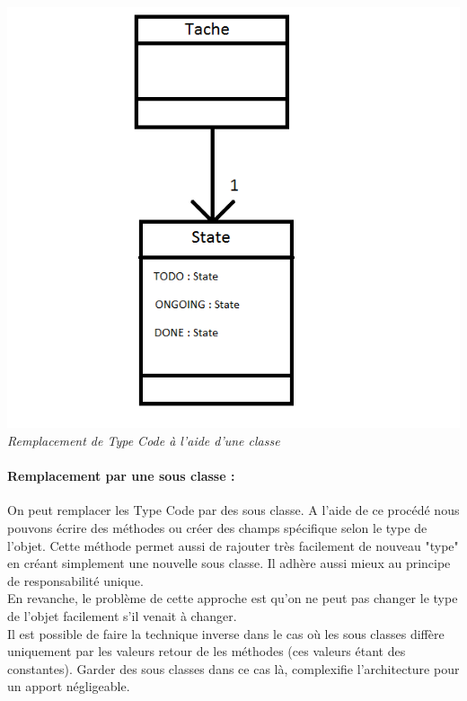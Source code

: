 \documentclass[a4paper,twoside,12pt,openright]{report}
\begin{document}
\begin{center}
\includegraphics[scale=1]{Image/TypeCodeClasse.png}\\
\itshape{Remplacement de Type Code à l'aide d'une classe}
\end{center}

\paragraph{Remplacement par une sous classe :}
On peut remplacer les Type Code par des sous classe. A l'aide de ce procédé nous pouvons écrire des méthodes ou créer des champs spécifique selon le type de l'objet. Cette méthode permet aussi de rajouter très facilement de nouveau "type" en créant simplement une nouvelle sous classe.
Il adhère aussi mieux au principe de responsabilité unique.\\
En revanche, le problème de cette approche est qu'on ne peut pas changer le type de l'objet facilement s'il venait à changer.\\
Il est possible de faire la technique inverse dans le cas où les sous classes diffère uniquement par les valeurs retour de les méthodes (ces valeurs étant des constantes). Garder des sous classes dans ce cas là, complexifie l'architecture pour un apport négligeable.
\end{document}
